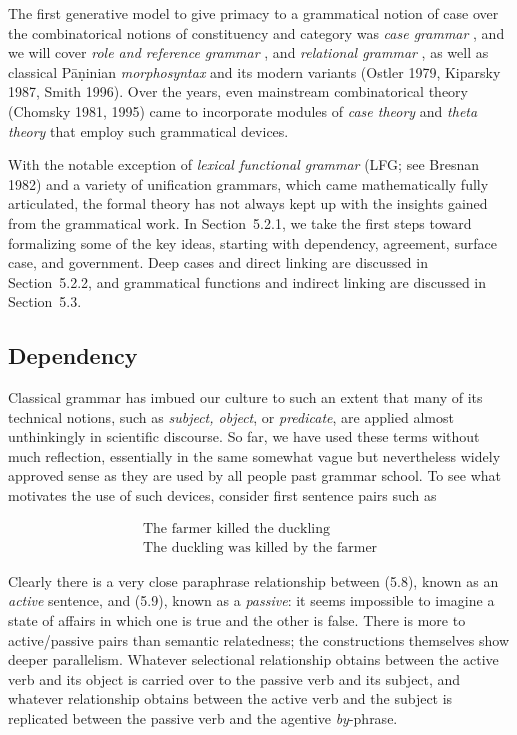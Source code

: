 The first generative model to give primacy to a grammatical notion of case
over the combinatorical notions of constituency and category was {\it case
  grammar} \cite{Fillmore:1968}, and we will cover {\it role and reference
  grammar} \cite{Valin:2005}, and {\it relational grammar}
\cite{Perlmutter:1983}, as well as classical P\={a}\d{n}inian {\it
  morphosyntax} and its modern variants (Ostler 1979, Kiparsky 1987, Smith
1996).  \nocite{Kiparsky:1987} \nocite{Ostler:1979} \nocite{Smith:1996} Over
the years, even mainstream combinatorical theory (Chomsky 1981, 1995) came to
incorporate modules of {\it case theory} and {\it theta theory} that employ
such grammatical devices.

With the notable exception of {\it lexical functional grammar} (LFG; see
Bresnan 1982)\nocite{Bresnan:1982}\nocite{Chomsky:1981}\nocite{Chomsky:1995}
and a variety of unification grammars, which came mathematically fully
articulated, the formal theory has not always kept up with the insights gained
from the grammatical work. In Section~5.2.1, we take the first steps toward
formalizing some of the key ideas, starting with dependency, agreement,
surface case, and government. Deep cases and direct linking are discussed in
Section~5.2.2, and grammatical
functions and indirect linking are discussed in Section~5.3.

\subsection{Dependency} 

Classical grammar has imbued our culture to such an extent that many of its
technical notions, such as {\it subject, object}, or {\it predicate}, are
applied almost unthinkingly in scientific discourse. So far, we have used
these terms without much reflection, essentially in the same somewhat vague
but nevertheless widely approved sense as they are used by all people past
grammar school. To see what motivates the use of such devices, consider first
sentence pairs such as

\begin{eqnarray}
\mbox{The farmer killed the duckling}\\
\mbox{The duckling was killed by the farmer}
\end{eqnarray}

\noindent 
Clearly there is a very close paraphrase relationship between (5.8), known as
an {\it active} sentence,   and (5.9), known as a
{\it passive}: it seems impossible to imagine a state of affairs in which one
is true and the other is false. There is more to active/passive pairs than
semantic relatedness; the constructions themselves show deeper parallelism.
Whatever selectional relationship obtains between the active verb and its
object is carried over to the passive verb and its subject, and whatever
relationship obtains between the active verb and the subject is replicated
between the passive verb and the agentive {\it by}-phrase. 


